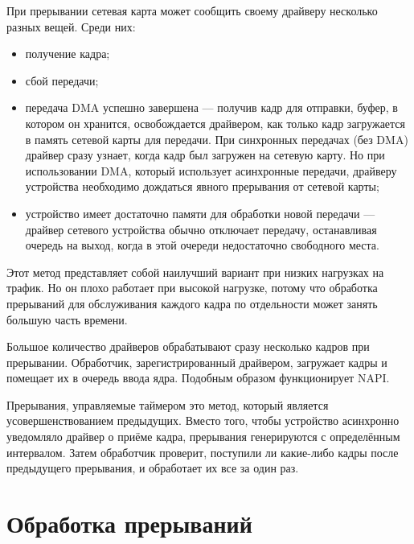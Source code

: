 При прерывании сетевая карта может сообщить своему драйверу несколько разных вещей. Среди них:
\begin{itemize}[label=---]
	\item получение кадра;
	\item сбой передачи;
	\item передача DMA успешно завершена --- получив кадр для отправки, буфер, в котором он хранится, освобождается драйвером, как только кадр загружается в память сетевой карты для передачи. При синхронных передачах (без DMA) драйвер сразу узнает, когда кадр был загружен на сетевую карту. Но при использовании DMA, который использует асинхронные передачи, драйверу устройства необходимо дождаться явного прерывания от сетевой карты;
	\item устройство имеет достаточно памяти для обработки новой передачи --- драйвер сетевого устройства обычно отключает передачу, останавливая очередь на выход, когда в этой очереди недостаточно свободного места.
\end{itemize}

Этот метод представляет собой наилучший вариант при низких нагрузках на трафик. Но он плохо работает при высокой нагрузке, потому что обработка прерываний для обслуживания каждого кадра по отдельности может занять большую часть времени.

Большое количество драйверов обрабатывают сразу несколько кадров при прерывании. Обработчик, зарегистрированный драйвером, загружает кадры и помещает их в очередь ввода ядра. Подобным образом функционирует NAPI.

Прерывания, управляемые таймером это метод, который является усовершенствованием предыдущих. Вместо того, чтобы устройство асинхронно уведомляло драйвер о приёме кадра, прерывания генерируются с определённым интервалом. Затем обработчик проверит, поступили ли какие-либо кадры после предыдущего прерывания, и обработает их все за один раз.

\section{Обработка прерываний}

